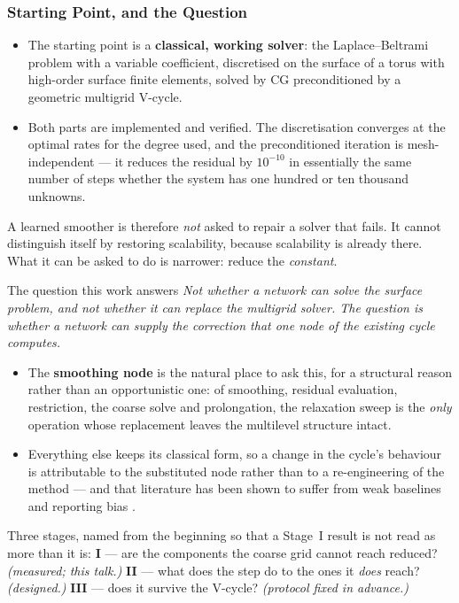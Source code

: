 \frametitle{Starting Point, and the Question}
\footnotesize

\begin{itemize}
\item The starting point is a \textbf{classical, working solver}: the Laplace--Beltrami
problem with a variable coefficient, discretised on the surface of a torus with high-order
surface finite elements, solved by CG preconditioned by a geometric multigrid V-cycle.
\item Both parts are implemented and verified. The discretisation converges at the optimal
rates for the degree used, and the preconditioned iteration is \alert{mesh-independent} ---
it reduces the residual by $10^{-10}$ in essentially the same number of steps whether the
system has one hundred or ten thousand unknowns.
\end{itemize}

\vspace{1mm}
A learned smoother is therefore \emph{not} asked to repair a solver that fails. It cannot
distinguish itself by restoring scalability, because scalability is already there. What it
can be asked to do is narrower: reduce the \emph{constant}.

\begin{block}{The question this work answers}
\itshape
Not whether a network can solve the surface problem, and not whether it can replace the
multigrid solver. The question is whether a network can supply the correction that
\emph{one node} of the existing cycle computes.
\end{block}

\begin{itemize}
\item The \textbf{smoothing node} is the natural place to ask this, for a structural
reason rather than an opportunistic one: of smoothing, residual evaluation, restriction,
the coarse solve and prolongation, the relaxation sweep is the \emph{only} operation whose
replacement leaves the multilevel structure intact.
\item Everything else keeps its classical form, so a change in the cycle's behaviour is
\alert{attributable to the substituted node} rather than to a re-engineering of the method
--- and that literature has been shown to suffer from weak baselines and reporting bias
\cite{mcgreivy2024weak}.
\end{itemize}

\vspace{1mm}
Three stages, named from the beginning so that a Stage~I result is not read as more than it
is: \textbf{I} --- are the components the coarse grid cannot reach reduced? \emph{(measured;
this talk.)} \textbf{II} --- what does the step do to the ones it \emph{does} reach?
\emph{(designed.)} \textbf{III} --- does it survive the V-cycle? \emph{(protocol fixed in
advance.)}
